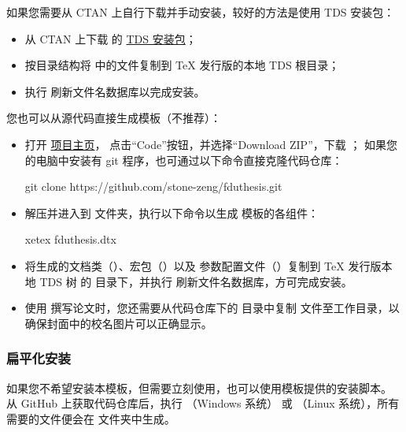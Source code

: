 \documentclass{ccnudoc}
\begin{document}
如果您需要从 CTAN 上自行下载并手动安装，较好的方法是使用 TDS
安装包：
\begin{itemize}
  \item 从 CTAN 上下载  的
    \href{http://mirror.ctan.org/install/macros/latex/contrib/fduthesis.tds.zip}{TDS 安装包}；
  \item 按目录结构将  中的文件复制到 \TeX{}
    发行版的本地 TDS 根目录；
  \item 执行  刷新文件名数据库以完成安装。
\end{itemize}
%
您也可以从源代码直接生成模板（不推荐）：
\begin{itemize}
  \item 打开 \href{https://github.com/stone-zeng/fduthesis}{项目主页}，
    点击“Code”按钮，并选择“Download ZIP”，下载 ；
    如果您的电脑中安装有 git 程序，也可通过以下命令直接克隆代码仓库：
    \begin{shellexample}[gobble=7,alsoletter={.},morekeywords={git,clone}]
      git clone https://github.com/stone-zeng/fduthesis.git
    \end{shellexample}
  \item 解压并进入到  文件夹，执行以下命令以生成
    模板的各组件：
    \begin{shellexample}[gobble=7,morekeywords={xetex}]
      xetex fduthesis.dtx
    \end{shellexample}
  \item 将生成的文档类（）、宏包（）以及
    参数配置文件（）复制到 \TeX{} 发行版本地 TDS 树
    的  目录下，并执行
     刷新文件名数据库，方可完成安装。
  \item 使用  撰写论文时，您还需要从代码仓库下的
     目录中复制 
    文件至工作目录，以确保封面中的校名图片可以正确显示。
\end{itemize}

\subsubsection{扁平化安装}

如果您不希望安装本模板，但需要立刻使用，也可以使用模板提供的安装脚本。
从 GitHub 上获取代码仓库后，执行 （Windows 系统）
或 （Linux 系统），所有需要的文件便会在
 文件夹中生成。
\end{document}
